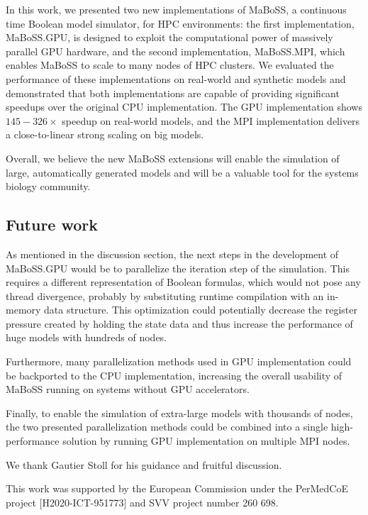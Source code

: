 \documentclass[times, twoside]{zHenriquesLab-StyleBioRxiv}
\begin{document}
In this work, we presented two new implementations of MaBoSS, a continuous time Boolean model simulator, for HPC environments: the first implementation, MaBoSS.GPU, is designed to exploit the computational power of massively parallel GPU hardware, and the second implementation, MaBoSS.MPI, which enables MaBoSS to scale to many nodes of HPC clusters. We evaluated the performance of these implementations on real-world and synthetic models and demonstrated that both implementations are capable of providing significant speedups over the original CPU implementation. The GPU implementation shows $145-326\times$ speedup on real-world models, and the MPI implementation delivers a close-to-linear strong scaling on big models.

Overall, we believe the new MaBoSS extensions will enable the simulation of large, automatically generated models and will be a valuable tool for the systems biology community.

\subsection*{Future work} 

As mentioned in the discussion section, the next steps in the development of MaBoSS.GPU would be to parallelize the iteration step of the simulation. This requires a different representation of Boolean formulas, which would not pose any thread divergence, probably by substituting runtime compilation with an in-memory data structure. This optimization could potentially decrease the register pressure created by holding the state data and thus increase the performance of huge models with hundreds of nodes.

Furthermore, many parallelization methods used in GPU implementation could be backported to the CPU implementation, increasing the overall usability of MaBoSS running on systems without GPU accelerators. 

Finally, to enable the simulation of extra-large models with thousands of nodes, the two presented parallelization methods could be combined into a single high-performance solution by running GPU implementation on multiple MPI nodes.


\begin{acknowledgements}
We thank Gautier Stoll for his guidance and fruitful discussion.
\end{acknowledgements}

\begin{funding}
This work was supported by the European Commission under the PerMedCoE project [H2020-ICT-951773] and SVV project number 260 698.
\end{funding}
\end{document}
